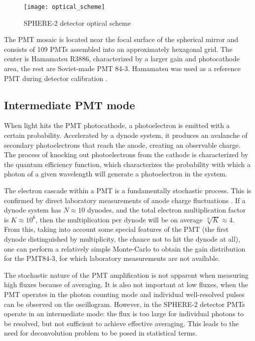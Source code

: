 \begin{figure}
	\centering
	\texttt{[image: optical\_scheme]}
	\caption{SPHERE-2 detector optical scheme}
	\label{pic:sphere-detector-optical-scheme}
\end{figure}

The PMT mosaic is located near the focal surface of the spherical mirror and consists of 109 PMTs assembled into an approximately hexagonal grid. The center is Hamamatsu R3886, characterized by a larger gain and photocathode area, the rest are Soviet-made PMT 84-3. Hamamatsu was used as a reference PMT during detector calibration \cite{SphereCalibration2016}.

\subsection{Intermediate PMT mode}
\label{sec:photon-to-phels-conversion}

When light hits the PMT photocathode, a photoelectron is emitted with a certain probability. Accelerated by a dynode system, it produces an avalanche of secondary photoelectrons that reach the anode, creating an observable charge. The process of knocking out photoelectrons from the cathode is characterized by the quantum efficiency function, which characterizes the probability with which a photon of a given wavelength will generate a photoelectron in the system.

The electron cascade within a PMT is a fundamentally stochastic process. This is confirmed by direct laboratory measurements of anode charge fluctuations \cite[Fig. 9]{SphereCalibration2016}. If a dynode system has $N \approx 10$ dynodes, and the total electron multiplication factor is $K \approx 10^6$, then the multiplication per dynode will be on average $\sqrt[N]{K} \approx 4$. From this, taking into account some special features of the PMT (the first dynode distinguished by multiplicity, the chance not to hit the dynode at all), one can perform a relatively simple Monte-Carlo to obtain the gain distribution for the PMT84-3, for which laboratory measurements are not available.

The stochastic nature of the PMT amplification is not apparent when measuring high fluxes because of averaging. It is also not important at low fluxes, when the PMT operates in the photon counting mode and individual well-resolved pulses can be observed on the oscillogram. However, in the SPHERE-2 detector PMTs operate in an intermediate mode: the flux is too large for individual photons to be resolved, but not sufficient to achieve effective averaging. This leads to the need for deconvolution problem to be posed in statistical terms.

